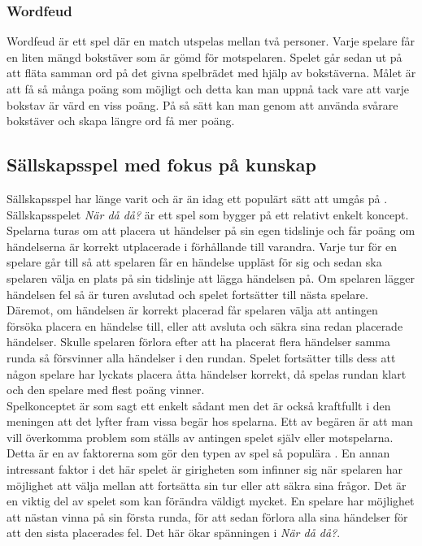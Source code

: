 \documentclass[a4paper, 11pt]{article}
\begin{document}
\subsubsection{Wordfeud}
Wordfeud \cite{aboutwordfeud} är ett spel där en match utspelas mellan två personer. Varje spelare får en liten mängd bokstäver som är gömd för motspelaren. Spelet går sedan ut på att fläta samman ord på det givna spelbrädet med hjälp av bokstäverna. Målet är att få så många poäng som möjligt och detta kan man uppnå tack vare att varje bokstav är värd en viss poäng. På så sätt kan man genom att använda svårare bokstäver och skapa längre ord få mer poäng. 

\subsection{Sällskapsspel med fokus på kunskap}
Sällskapsspel har länge varit och är än idag ett populärt sätt att umgås på \cite{bradspelspop}. Sällskapsspelet \textit{När då då?} \cite{nardada} är ett spel som bygger på ett relativt enkelt koncept. Spelarna turas om att placera ut händelser på sin egen tidslinje och får poäng om händelserna är korrekt utplacerade i förhållande till varandra. Varje tur för en spelare går till så att spelaren får en händelse uppläst för sig och sedan ska spelaren välja en plats på sin tidslinje att lägga händelsen på. Om spelaren lägger händelsen fel så är turen avslutad och spelet fortsätter till nästa spelare. Däremot, om händelsen är korrekt placerad får spelaren välja att antingen försöka placera en händelse till, eller att avsluta och säkra sina redan placerade händelser. Skulle spelaren förlora efter att ha placerat flera händelser samma runda så försvinner alla händelser i den rundan. Spelet fortsätter tills dess att någon spelare har lyckats placera åtta händelser korrekt, då spelas rundan klart och den spelare med flest poäng vinner.\\
Spelkonceptet är som sagt ett enkelt sådant men det är också kraftfullt i den meningen att det lyfter fram vissa begär hos spelarna. Ett av begären är att man vill överkomma problem som ställs av antingen spelet själv eller motspelarna. Detta är en av faktorerna som gör den typen av spel så populära \cite{psykologi}. En annan intressant faktor i det här spelet är girigheten som infinner sig när spelaren har möjlighet att välja mellan att fortsätta sin tur eller att säkra sina frågor. Det är en viktig del av spelet som kan förändra väldigt mycket. En spelare har möjlighet att nästan vinna på sin första runda, för att sedan förlora alla sina händelser för att den sista placerades fel. Det här ökar spänningen i \textit{När då då?}.
\end{document}
